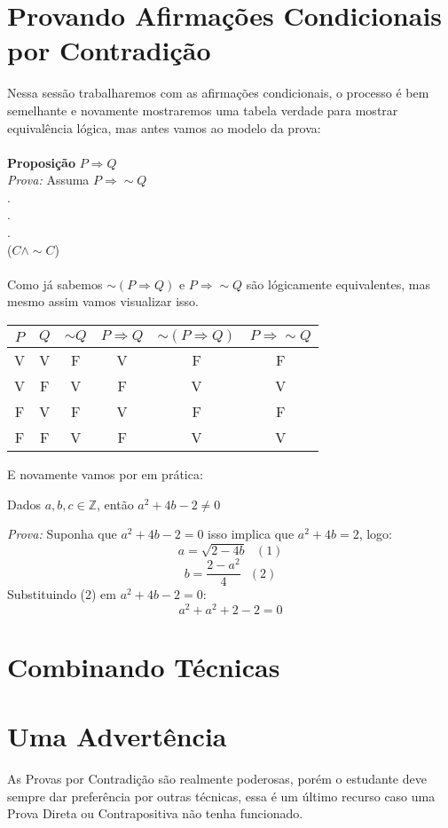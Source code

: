 \documentclass[main.tex]{subfiles}
\begin{document}
\section{Provando Afirmações Condicionais por Contradição}
Nessa sessão trabalharemos com as afirmações condicionais, o processo é bem semelhante e novamente mostraremos uma tabela verdade para mostrar equivalência lógica, mas antes vamos ao modelo da prova: \\ \\
\textbf{Proposição} $P \Rightarrow Q$ \\
\textit{Prova:} Assuma $P \Rightarrow \sim Q$\\
. \\
. \\
. \\
($C \land \sim C$) \\ \\
Como já sabemos $\sim(P \Rightarrow Q)$ e $P \Rightarrow \sim Q$ são lógicamente equivalentes, mas mesmo assim vamos visualizar isso. \\
\begin{center}
\begin{tabular}{| c | c || c | c | c | c |} \hline
$P$ & $Q$ & $\sim Q$ & $P \Rightarrow Q$ & $\sim(P \Rightarrow Q)$ & $P \Rightarrow \sim Q$ \\ \hline
V & V & F & V & F & F \\ 
V & F & V & F & V & V \\ 
F & V & F & V & F & F \\ 
F & F & V & F & V & V \\ \hline
\end{tabular}
\end{center}
E novamente vamos por em prática:
\begin{proposition}
Dados $a,b,c \in \mathbb{Z}$, então $a^2 + 4b -2 \neq 0$
\end{proposition}
\textit{Prova:} Suponha que $a^2 + 4b -2 = 0$ isso implica que $a^2 + 4b = 2$, logo:
$$a = \sqrt{2-4b} \ \ \ (1)$$
$$b = \frac{2-a^2}{4} \ \ \ (2) $$
Substituindo (2) em $a^2 + 4b -2 = 0$:
$$a^2 + a^2 + 2 -2 = 0$$
\section{Combinando Técnicas}
\section{Uma Advertência}
As Provas por Contradição são realmente poderosas, porém o estudante deve sempre dar preferência por outras técnicas, essa é um último recurso caso uma Prova Direta ou Contrapositiva não tenha funcionado.

\end{document}
